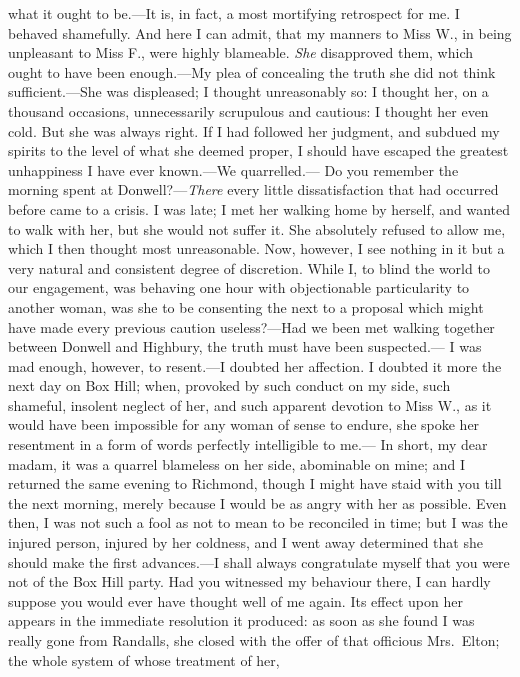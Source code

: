 what it ought to be.---It is, in fact, a most mortifying retrospect
for me.  I behaved shamefully.  And here I can admit, that my manners
to Miss W., in being unpleasant to Miss F., were highly blameable.
\emph{She} disapproved them, which ought to have been enough.---My plea of
concealing the truth she did not think sufficient.---She was displeased;
I thought unreasonably so:  I thought her, on a thousand occasions,
unnecessarily scrupulous and cautious:  I thought her even cold.
But she was always right.  If I had followed her judgment, and subdued
my spirits to the level of what she deemed proper, I should have
escaped the greatest unhappiness I have ever known.---We quarrelled.---%
Do you remember the morning spent at Donwell?---\emph{There} every little
dissatisfaction that had occurred before came to a crisis.  I was late;
I met her walking home by herself, and wanted to walk with her,
but she would not suffer it.  She absolutely refused to allow me,
which I then thought most unreasonable.  Now, however, I see nothing
in it but a very natural and consistent degree of discretion.
While I, to blind the world to our engagement, was behaving one
hour with objectionable particularity to another woman, was she
to be consenting the next to a proposal which might have made
every previous caution useless?---Had we been met walking together
between Donwell and Highbury, the truth must have been suspected.---%
I was mad enough, however, to resent.---I doubted her affection.
I doubted it more the next day on Box Hill; when, provoked by
such conduct on my side, such shameful, insolent neglect of her,
and such apparent devotion to Miss W., as it would have been
impossible for any woman of sense to endure, she spoke her
resentment in a form of words perfectly intelligible to me.---%
In short, my dear madam, it was a quarrel blameless on her side,
abominable on mine; and I returned the same evening to Richmond,
though I might have staid with you till the next morning,
merely because I would be as angry with her as possible.  Even then,
I was not such a fool as not to mean to be reconciled in time;
but I was the injured person, injured by her coldness, and I went
away determined that she should make the first advances.---I shall
always congratulate myself that you were not of the Box Hill party.
Had you witnessed my behaviour there, I can hardly suppose you would
ever have thought well of me again.  Its effect upon her appears
in the immediate resolution it produced:  as soon as she found I
was really gone from Randalls, she closed with the offer of that
officious Mrs.\ Elton; the whole system of whose treatment of her,
